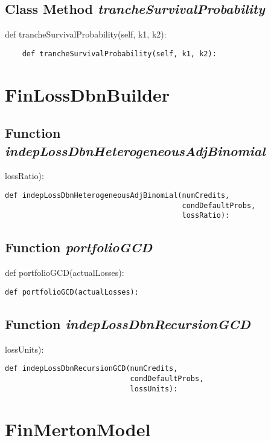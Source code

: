 \documentclass[twoside,11pt]{book}
\begin{document}
\subsection{Class Method {\it trancheSurvivalProbability}}
def trancheSurvivalProbability(self, k1, k2):

\begin{lstlisting}
    def trancheSurvivalProbability(self, k1, k2):
\end{lstlisting}

\newpage
\section{FinLossDbnBuilder}

\subsection{Function {\it indepLossDbnHeterogeneousAdjBinomial}}
lossRatio):

\begin{lstlisting}
def indepLossDbnHeterogeneousAdjBinomial(numCredits,
                                         condDefaultProbs,
                                         lossRatio):
\end{lstlisting}

\subsection{Function {\it portfolioGCD}}
def portfolioGCD(actualLosses):

\begin{lstlisting}
def portfolioGCD(actualLosses):
\end{lstlisting}

\subsection{Function {\it indepLossDbnRecursionGCD}}
lossUnits):

\begin{lstlisting}
def indepLossDbnRecursionGCD(numCredits, 
                             condDefaultProbs,
                             lossUnits):
\end{lstlisting}

\newpage
\section{FinMertonModel}
\end{document}
